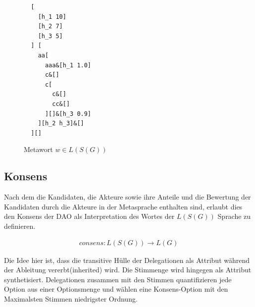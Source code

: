 \documentclass[a4paper,12pt]{report}
\begin{document}
\begin{figure}[ht]
  \centering
  \begin{lstlisting}
  [
    [h_1 10]
    [h_2 7]
    [h_3 5]
  ] [
    aa[
      aaa&[h_1 1.0]
      c&[]
      c[
        c&[]
        cc&[]
      ][]&[h_3 0.9]
    ][h_2 h_3]&[]
  ][]
  \end{lstlisting}
    \caption{Metawort $w\in L(S(G))$}
    \label{metaword}
\end{figure}






\subsection{Konsens}

Nach dem die Kandidaten, die Akteure sowie ihre Anteile und die Bewertung der Kandidaten durch die Akteure in der Metasprache enthalten sind, erlaubt dies den Konsens der DAO als Interpretation des Wortes der $L(S(G))$ Sprache zu definieren. 

\begin{eqnarray}
consens: L(S(G)) \rightarrow L(G)
\end{eqnarray}

Die Idee hier ist, dass die transitive Hülle der Delegationen als
Attribut während der Ableitung vererbt(inherited) wird. Die Stimmenge 
wird hingegen als Attribut synthetisiert.\cite{Knuth1968} Delegationen zusammen mit den Stimmen quantifizieren jede Option aus einer Optionsmenge und wählen
eine Konsens-Option mit den Maximalsten Stimmen niedrigster Ordnung.


\end{document}
